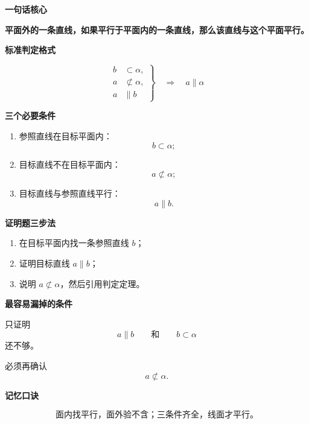 \begin{summarybox}
	\textbf{\textcolor{CSummary}{一句话核心}}

	\textbf{平面外的一条直线，如果平行于平面内的一条直线，那么该直线与这个平面平行。}

	\medskip
	\textbf{\textcolor{CSummary}{标准判定格式}}

	\[
		\left.
		\begin{aligned}
			b & \subset \alpha,     \\
			a & \not\subset \alpha, \\
			a & \parallel b
		\end{aligned}
		\right\}
		\quad\Longrightarrow\quad
		a\parallel\alpha
	\]

	\textbf{\textcolor{CSummary}{三个必要条件}}

	\begin{enumerate}[leftmargin=*, itemsep=0.4em, topsep=0.35em]
		\item 参照直线在目标平面内：
		      \[
			      b\subset\alpha;
		      \]

		\item 目标直线不在目标平面内：
		      \[
			      a\not\subset\alpha;
		      \]

		\item 目标直线与参照直线平行：
		      \[
			      a\parallel b.
		      \]
	\end{enumerate}

	\medskip
	\textbf{\textcolor{CSummary}{证明题三步法}}

	\begin{enumerate}[leftmargin=*, itemsep=0.4em, topsep=0.35em]
		\item 在目标平面内找一条参照直线 $b$；
		\item 证明目标直线 $a\parallel b$；
		\item 说明 $a\not\subset\alpha$，然后引用判定定理。
	\end{enumerate}

	\medskip
	\textbf{\textcolor{CSummary}{最容易漏掉的条件}}

	只证明
	\[
		a\parallel b
		\qquad\text{和}\qquad
		b\subset\alpha
	\]
	还不够。

	必须再确认
	\[
		a\not\subset\alpha.
	\]

	\medskip
	\textbf{\textcolor{CSummary}{记忆口诀}}

	\[
		\boxed{\text{面内找平行，面外验不含；三条件齐全，线面才平行。}}
	\]
\end{summarybox}